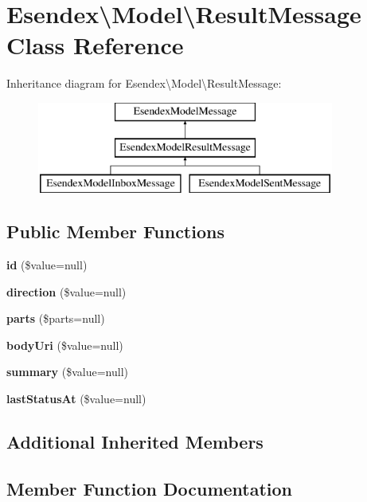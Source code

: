 \section{Esendex\textbackslash{}Model\textbackslash{}Result\-Message Class Reference}
\label{class_esendex_1_1_model_1_1_result_message}
Inheritance diagram for Esendex\textbackslash{}Model\textbackslash{}Result\-Message\-:\begin{figure}[H]
\begin{center}
\leavevmode
\includegraphics[height=3.000000cm]{class_esendex_1_1_model_1_1_result_message}
\end{center}
\end{figure}
\subsection*{Public Member Functions}
\begin{DoxyCompactItemize}
\item 
{\bf id} (\$value=null)
\item 
{\bf direction} (\$value=null)
\item 
{\bf parts} (\$parts=null)
\item 
{\bf body\-Uri} (\$value=null)
\item 
{\bf summary} (\$value=null)
\item 
{\bf last\-Status\-At} (\$value=null)
\end{DoxyCompactItemize}
\subsection*{Additional Inherited Members}


\subsection{Member Function Documentation}

